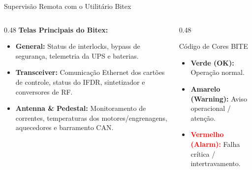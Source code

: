 ﻿\documentclass[aspectratio=169]{beamer}
\begin{document}
\begin{frame}{Supervis{\~a}o Remota com o Utilit{\'a}rio Bitex}
    \begin{columns}[T]
        \begin{column}{0.48\textwidth}
            \textbf{Telas Principais do Bitex:}
            \begin{itemize}
                \item \textbf{General:} Status de interlocks, bypass de seguran{\c{c}}a, telemetria da UPS e baterias.
                \item \textbf{Transceiver:} Comunica{\c{c}}{\~a}o Ethernet dos cart{\~o}es de controle, status do IFDR, sintetizador e conversores de RF.
                \item \textbf{Antenna \& Pedestal:} Monitoramento de correntes, temperaturas dos motores/engrenagens, aquecedores e barramento CAN.
            \end{itemize}
        \end{column}
        \begin{column}{0.48\textwidth}
            \begin{block}{C{\'o}digo de Cores BITE}
                \begin{itemize}
                    \item \textcolor{AccentGreen}{\textbf{Verde (OK):}} Opera{\c{c}}{\~a}o normal.
                    \item \textcolor{WarningYellow}{\textbf{Amarelo (Warning):}} Aviso operacional / aten{\c{c}}{\~a}o.
                    \item \textcolor{red}{\textbf{Vermelho (Alarm):}} Falha cr{\'i}tica / intertravamento.
                \end{itemize}
            \end{block}
        \end{column}
    \end{columns}
\end{frame}
\end{document}
